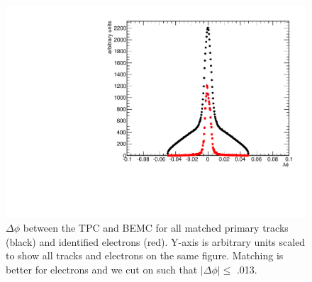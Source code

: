 \begin{figure}[htbp]
\begin{center}
\includegraphics[scale=.8]{Plots/NPE/point_dphi.pdf}
\end{center}
\caption[TPC to BEMC $\Delta\phi$]{$\Delta\phi$ between the TPC and BEMC for all matched primary tracks (black) and identified electrons (red). Y-axis is arbitrary units scaled to show all tracks and electrons on the same figure. Matching is better for electrons and we cut on such that $|\Delta\phi| \leq$ .013.}
\label{fig:point_dphi}
\end{figure}

